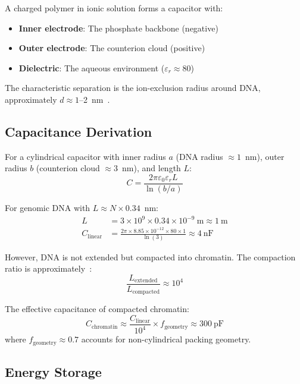 \documentclass[twocolumn,aps,prb,superscriptaddress,longbibliography,floatfix]{revtex4-2}
\theoremstyle{remark}
\begin{document}
A charged polymer in ionic solution forms a capacitor with:
\begin{itemize}
    \item \textbf{Inner electrode}: The phosphate backbone (negative)
    \item \textbf{Outer electrode}: The counterion cloud (positive)
    \item \textbf{Dielectric}: The aqueous environment ($\varepsilon_r \approx 80$)
\end{itemize}

The characteristic separation is the ion-exclusion radius around DNA,
approximately $d \approx 1$--2~nm~\cite{Bloomfield1997}.

\subsection{Capacitance Derivation}

For a cylindrical capacitor with inner radius $a$ (DNA radius $\approx 1$~nm),
outer radius $b$ (counterion cloud $\approx 3$~nm), and length $L$:
\begin{equation}
C = \frac{2\pi\varepsilon_0\varepsilon_r L}{\ln(b/a)}
\label{eq:cylinder_cap}
\end{equation}

For genomic DNA with $L \approx N \times 0.34$~nm:
\begin{align}
L &= 3 \times 10^9 \times 0.34 \times 10^{-9}~\text{m} \approx 1~\text{m} \\
C_\text{linear} &= \frac{2\pi \times 8.85 \times 10^{-12} \times 80 \times 1}{\ln(3)} \approx 4~\text{nF}
\end{align}

However, DNA is not extended but compacted into chromatin. The
compaction ratio is approximately~\cite{Luger1997}:
\begin{equation}
\frac{L_\text{extended}}{L_\text{compacted}} \approx 10^4
\end{equation}

The effective capacitance of compacted chromatin:
\begin{equation}
C_\text{chromatin} \approx \frac{C_\text{linear}}{10^4} \times f_\text{geometry} \approx 300~\text{pF}
\label{eq:dna_capacitance}
\end{equation}
where $f_\text{geometry} \approx 0.7$ accounts for non-cylindrical
packing geometry.

\subsection{Energy Storage}
\end{document}
